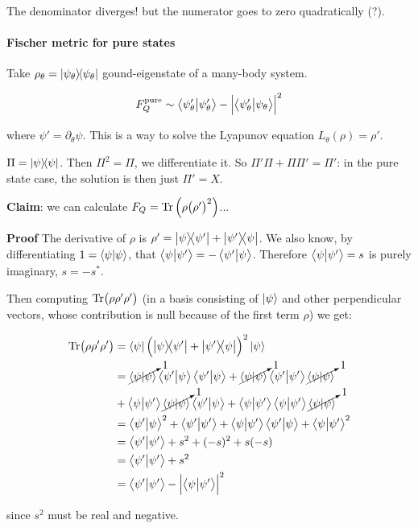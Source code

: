 \documentclass[main_zanardi.tex]{subfiles}
\begin{document}
The denominator diverges! but the numerator goes to zero quadratically (?).

\paragraph{Fischer metric for pure states}

Take \( \rho_\theta = \ketbra{\psi_\theta} \) gound-eigenstate of a many-body system.

\begin{equation}
  F_Q ^{\text{pure}} \sim \braket{\psi_\theta'}{\psi_\theta'} - \abs{\braket{\psi_\theta'}{\psi_\theta}}^2
\end{equation}

where \( \psi' = \partial_\theta \psi \). This is a way to solve the Lyapunov equation \( L_\theta (\rho) = \rho' \).

\( \Pi = \ketbra{\psi} \). Then \(\Pi ^2 = \Pi\), we differentiate it.
So \( \Pi' \Pi + \Pi \Pi' = \Pi' \): in the pure state case, the solution is then just \( \Pi ' = X \).

\textbf{Claim}: we can calculate  \( F_Q =  \Tr \qty(\rho \qty(\rho')^2)\)...

\begin{greenbox}
  \textbf{Proof}
  The derivative of \( \rho \) is \( \rho' = \ketbra{\psi}{\psi'} + \ketbra{\psi'}{\psi} \).
  We also know, by differentiating \(1 = \braket{\psi}{\psi} \), that \(\braket{\psi}{\psi'} = - \braket{\psi'}{\psi} \). Therefore \(\braket{\psi}{\psi'} = s\) is purely imaginary, \(s = -s^*\).

  Then computing \( \Tr(\rho \rho' \rho')\) (in a basis consisting of \(\ket{\psi } \) and other perpendicular vectors, whose contribution is null because of the first term \(\rho\)) we get:

\begin{subequations}
\begin{align}
   \Tr(\rho \rho' \rho')
   &= \bra{\psi} \qty(\ketbra{\psi}{\psi'} + \ketbra{\psi'}{\psi})^2 \ket{\psi}   \\
   &= \cancelto{1}{\braket{\psi}{\psi}}\braket{\psi'}{\psi}\braket{\psi'}{\psi}
   + \cancelto{1}{\braket{\psi}{\psi}}\braket{\psi'}{\psi'}\cancelto{1}{\braket{\psi}{\psi}} \nonumber \\
   &+ \braket{\psi}{\psi'}\cancelto{1}{\braket{\psi}{\psi}}\braket{\psi'}{\psi}
   + \braket{\psi}{\psi'}\braket{\psi}{\psi'}\cancelto{1}{\braket{\psi}{\psi}} \\
   &= \braket{\psi'}{\psi}^2
   + \braket{\psi'}{\psi'} + \braket{\psi}{\psi'}\braket{\psi'}{\psi}
   + \braket{\psi}{\psi'}^2  \\
   &= \braket{\psi'}{\psi'} + s^2 + (-s)^2 + s(-s)  \\
   &= \braket{\psi'}{\psi'} + s^2  \\
   &= \braket{\psi'}{\psi'} - \abs{\braket{\psi}{\psi'}}^2
\end{align}
\end{subequations}

since \(s^2 \) must be real and negative.

\end{greenbox}
\end{document}
